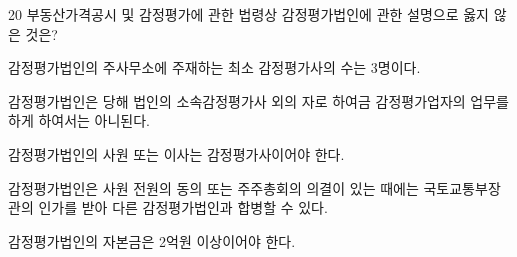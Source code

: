 \begin{question}{20}
부동산가격공시 및 감정평가에 관한 법령상 감정평가법인에 관한 설명으로 옳지 않은 것은?
\begin{choices}
  \item 감정평가법인의 주사무소에 주재하는 최소 감정평가사의 수는 3명이다.
  \item 감정평가법인은 당해 법인의 소속감정평가사 외의 자로 하여금 감정평가업자의 업무를 하게 하여서는 아니된다.
  \item 감정평가법인의 사원 또는 이사는 감정평가사이어야 한다.
  \item 감정평가법인은 사원 전원의 동의 또는 주주총회의 의결이 있는 때에는 국토교통부장관의 인가를 받아 다른 감정평가법인과 합병할 수 있다.
  \item 감정평가법인의 자본금은 2억원 이상이어야 한다.
\end{choices}
\end{question}
